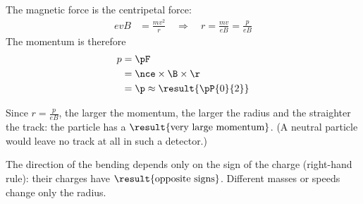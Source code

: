 \begin{abcliste}
\abc The magnetic force is the centripetal force:
\begin{align}
 e v B &= \frac{m v^2}{r} \quad\Longrightarrow\quad r = \frac{m v}{e B} = \frac{p}{e B}
\end{align}
The momentum is therefore
\begin{align}
 p &= \pF \\
   &= \nce\times\B\times\r \\
   &= \p \approx \result{\pP{0}{2}}
\end{align}

\abc Since $r = \frac{p}{eB}$, the larger the momentum, the larger the radius and the straighter the track: the particle has a $\result{\text{very large momentum}}$. (A neutral particle would leave no track at all in such a detector.)

\abc The direction of the bending depends only on the sign of the charge (right-hand rule): their charges have $\result{\text{opposite signs}}$. Different masses or speeds change only the radius.
\end{abcliste}
